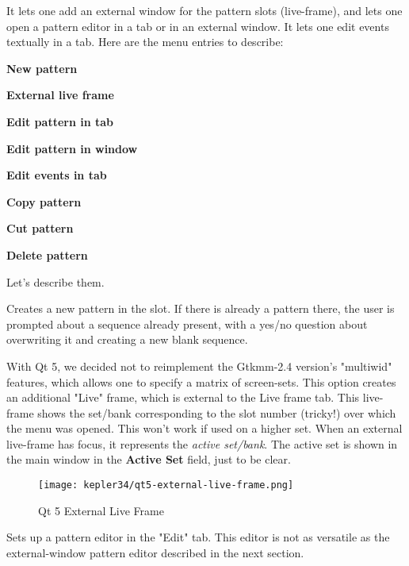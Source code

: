   It lets one add an external window for the pattern slots (live-frame),
   and lets one open a pattern editor in a tab or in an external window.
   It lets one edit events textually in a tab.  Here are the menu entries to
   describe:
   
   \begin{enumber}
      \item \textbf{New pattern}
      \item \textbf{External live frame}
      \item \textbf{Edit pattern in tab}
      \item \textbf{Edit pattern in window}
      \item \textbf{Edit events in tab}
      \item \textbf{Copy pattern}
      \item \textbf{Cut pattern}
      \item \textbf{Delete pattern}
   \end{enumber}

   Let's describe them.

   \setcounter{ItemCounter}{0}      %

      Creates a new pattern in the slot.
      If there is already a pattern there, the user is prompted about a
      sequence already present, with a yes/no question about overwriting it and
      creating a new blank sequence.

      With Qt 5, we decided not to reimplement the Gtkmm-2.4 version's
      "multiwid" features, which allows one to specify a matrix of screen-sets.
      This option creates an additional "Live" frame, which is external to the
      Live frame tab.  This live-frame shows the set/bank corresponding to the
      slot number (tricky!) over which the menu was opened.  This won't work if
      used on a higher set.  When an external live-frame has focus, it
      represents the \textsl{active set/bank}.  The active set is shown in the
      main window in the \textbf{Active Set} field, just to be clear.

\begin{figure}[H]
   \centering 
   \texttt{[image: kepler34/qt5-external-live-frame.png]}
   \caption{Qt 5 External Live Frame}
   \label{fig:qt5_main_window_external_live_frame}
\end{figure}

      Sets up a pattern editor in the "Edit" tab.  This editor is not as
      versatile as the external-window pattern editor described in the next
      section.

